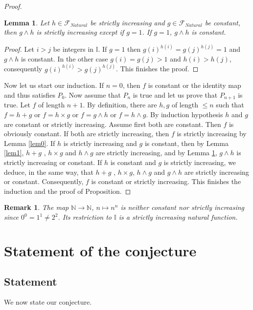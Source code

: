 \documentclass{alggeom}
\renewcommand{\leq}{\leqslant}
\newtheorem{lemm}[theo]{Lemma}
\newtheorem{rema}[theo]{Remark}
\newcommand{\N}{\mathbb{N}}
\newcommand{\I}{\mathbb{I}}
\begin{document}
\begin{proof}
\begin{lemm} \label{lem2} Let $h \in \mathscr{F}_{Natural}$ be strictly increasing and $g  \in \mathscr{F} _{Natural}$ be constant, then $g \wedge h $ is strictly increasing except if $g=1$. If $g=1$, $g \wedge h $ is constant.
\end{lemm}

\begin{proof} Let $i>j$ be integers in $\I$. If $g=1$ then $g(i) ^{ h(i)}=g(j) ^{ h(j)}=1$ and $g \wedge h$ is constant. In the other case $g(i)=g(j) >1$ and $h(i)>h(j)$, consequently $g(i) ^ {h(i)} > g (j) ^{ h(j)}$. This finishes the proof.
\end{proof}
 
 Now let us start our induction. If $n=0$, then $f$ is constant or the identity map and thus satisfies $P_0$. Now assume that $P_n$ is true and let us prove that $P_{n+1}$ is true. Let $f $ of length $n+1$.  By definition, there are $h,g $ of length $\leq n$ such that $f=h+g$ or $f=h \times g $ or $f = g \wedge h$ or $f= h \wedge g$. By induction hypothesis $h$ and $g$ are constant or strictly increasing.  Assume first both are constant. Then $f$ is obviously constant. If both are strictly increasing, then $f$ is strictly increasing by Lemma \ref{lem0}. If $h$ is strictly increasing and $g$ is constant, then by Lemma \ref{lem1}, $h+g$ , $h \times g$ and $h \wedge g$ are strictly increasing, and by Lemma \ref{lem2}, $g \wedge h$ is strictly increasing or constant. If $h$ is constant and $g$ is strictly increasing, we deduce, in the same way, that $h+g$ , $h \times g$, $h \wedge g$ and $g \wedge h$ are strictly increasing or constant. Consequently, $f$ is constant or strictly increasing. This finishes the induction and the proof of Proposition.


\end{proof}

\begin{rema} The map $\N \to \N$, $n \mapsto n^n$ is neither constant nor strictly increasing since $0^0=1^1\neq 2^2$. Its restriction to $\I$ is a strictly increasing natural function.

\end{rema}




\section{Statement of the conjecture}

\subsection{Statement}
We now state our conjecture.
\end{document}
